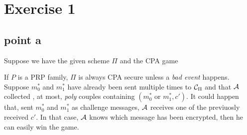 \chapter{Exercise 1}
\section{point a}

Suppose we have the given scheme $\Pi$ and the CPA game

\begin{figure}[h!]
   \centering
   \sdinit{}
\end{figure}


If $P$ is a PRP family, $\Pi$ is always CPA secure unless a \textit{bad event }
happens.\\

Suppose $m^{*}_{0}$ and $m^{*}_{1}$ have already been sent multiple times to
$\mathcal{C}_{\Pi}$ and that $\mathcal{A}$ collected , at most, \textit{poly} couples containing
$(m^{*}_{0} \text{ or } m^{*}_{1}, c' )$. It could happen that, sent  $m^{*}_{0}$ and
$m^{*}_{1}$ as challenge messages, $\mathcal{A}$ receives one of the previuosly received
$c'$. In that case, $\mathcal{A}$ knows which message has been encrypted, then he can
easily win the game.\\

